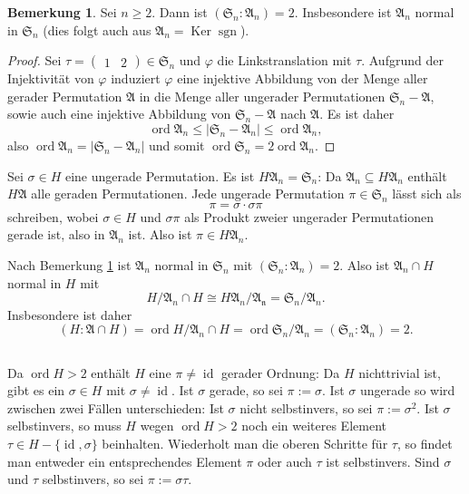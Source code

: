 \documentclass[a4paper,10pt]{article}
\theoremstyle{definition}
\newtheorem{bem}[beh]{Bemerkung}
\newcommand{\Sn}{\mathfrak{S}}
\newcommand{\mf}[1]{\mathfrak{#1}}
\newcommand{\id}{\operatorname{id}}
\newcommand{\ord}{\operatorname{ord}}
\newcommand{\sgn}{\operatorname{sgn}}
\newcommand{\Ker}{\operatorname{Ker}}
\newcommand{\vect}[1]{\begin{pmatrix}#1\end{pmatrix}}
\begin{document}
\begin{bem}\label{bem: index A_n}
 Sei $n \geq 2$. Dann ist $(\Sn_n : \mf{A}_n) = 2$. Insbesondere ist $\mf{A}_n$ normal in $\Sn_n$ (dies folgt auch aus $\mf{A}_n = \Ker \sgn$).
\end{bem}
\begin{proof}
 Sei $\tau = \vect{1 & 2} \in \Sn_n$ und $\varphi$ die Linkstranslation mit $\tau$. Aufgrund der Injektivität von $\varphi$ induziert $\varphi$ eine injektive Abbildung von der Menge aller gerader Permutation $\mf{A}$ in die Menge aller ungerader Permutationen $\Sn_n - \mf{A}$, sowie auch eine injektive Abbildung von $\Sn_n-\mf{A}$ nach $\mf{A}$. Es ist daher
 \[
  \ord \mf{A}_n \leq |\Sn_n - \mf{A}_n| \leq \ord \mf{A}_n,
 \]
 also $\ord \mf{A}_n = |\Sn_n - \mf{A}_n|$ und somit $\ord \Sn_n = 2 \ord \mf{A}_n$.
\end{proof}



Sei $\sigma \in H$ eine ungerade Permutation.
Es ist $H \mf{A}_n = \Sn_n$: Da $\mf{A}_n \subseteq H \mf{A}_n$ enthält $H\mf{A}$ alle geraden Permutationen. Jede ungerade Permutation $\pi \in \Sn_n$ lässt sich als
\[
 \pi = \sigma \cdot \sigma \pi
\]
schreiben, wobei $\sigma \in H$ und $\sigma \pi$ als Produkt zweier ungerader Permutationen gerade ist, also in $\mf{A}_n$ ist. Also ist $\pi \in H \mf{A}_n$.

Nach Bemerkung \ref{bem: index A_n} ist $\mf{A}_n$ normal in $\Sn_n$ mit $(\Sn_n : \mf{A}_n) = 2$. Also ist $\mf{A}_n \cap H$ normal in $H$ mit
\[
 H / \mf{A}_n \cap H \cong H\mf{A}_n / \mf{A_n} = \Sn_n / \mf{A}_n.
\]
Insbesondere ist daher
\[
 (H : \mf{A} \cap H) = \ord H / \mf{A}_n \cap H = \ord \Sn_n / \mf{A}_n = (\Sn_n : \mf{A}_n) = 2.
\]


\subsection{}
Da $\ord H > 2$ enthält $H$ eine $\pi \neq \id$ gerader Ordnung: Da $H$ nichttrivial ist, gibt es ein $\sigma \in H$ mit $\sigma \neq \id$. Ist $\sigma$ gerade, so sei $\pi := \sigma$. Ist $\sigma$ ungerade so wird zwischen zwei Fällen unterschieden: Ist $\sigma$ nicht selbstinvers, so sei $\pi := \sigma^2$. Ist $\sigma$ selbstinvers, so muss $H$ wegen $\ord H > 2$ noch ein weiteres Element $\tau \in H-\{\id,\sigma\}$ beinhalten. Wiederholt man die oberen Schritte für $\tau$, so findet man entweder ein entsprechendes Element $\pi$ oder auch $\tau$ ist selbstinvers. Sind $\sigma$ und $\tau$ selbstinvers, so sei $\pi := \sigma \tau$.
\end{document}
